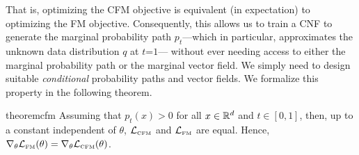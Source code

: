 \documentclass{article}
\begin{document}
That is, optimizing the CFM objective is equivalent (in expectation) to optimizing the FM objective. Consequently, this allows us to train a CNF to generate the marginal probability path $p_t$---which in particular, approximates the unknown data distribution $q$ at $t$=$1$---
without ever needing access to either the marginal probability path or the marginal vector field. We simply need to design suitable \emph{conditional} probability paths and vector fields.
%
We formalize this property in the following theorem.
\begin{restatable}{theorem}{cfm}\label{thm:grad_VR_equals_CVR}
Assuming that $p_t(x)>0$ for all $x\in\mathbb R^d$ and $t\in [0,1]$, then, up to a constant independent of $\theta$, ${\mathcal{L}}_{\scriptscriptstyle \text{CFM}}$ and ${\mathcal{L}}_{\scriptscriptstyle \text{FM}}$ are equal. Hence,  
$\nabla_\theta \mathcal{L}_{\scriptscriptstyle \text{FM}}(\theta) = \nabla_\theta \mathcal{L}_{\scriptscriptstyle \text{CFM}}(\theta)$.
\end{restatable}



\end{document}
